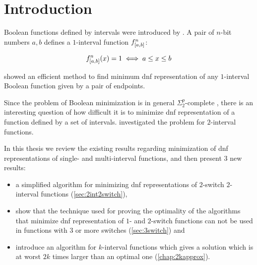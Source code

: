 \chapter*{Introduction}

Boolean functions defined by intervals were introduced
by \citet{Schieber2005154}.
A pair of $n$-bit numbers $a, b$
defines a $1$-interval function
$f^{n}_{[a, b]}$:

\[
f^{n}_{[a, b]} (x) = 1
\iff a \leq x \leq b
\]

\citeauthor{Schieber2005154} showed an efficient method
to find minimum \acrshort{dnf} representation
of any $1$-interval Boolean function
given by a pair of endpoints.

Since the problem of Boolean minimization is in general
$\Sigma_2^p$-complete \citep{Umans1998},
there is an interesting question of how difficult it is
to minimize \acrshort{dnf} representation of
a function defined by a set of intervals.
\citeauthor{Dubovsky2012} investigated the problem
for $2$-interval functions.

In this thesis we review the existing results regarding
minimization of \acrshort{dnf} representations of
single- and multi-interval functions,
and then present 3 new results:

\begin{itemize}
\item a simplified algorithm
for minimizing \acrshort{dnf} representations
of $2$-switch
$2$-interval functions (\autoref{sec:2int2switch}),
\item
show that the technique used for proving the optimality
of the algorithms that minimize
\acrshort{dnf} representation
of $1$- and $2$-switch functions
can not be used in
functions with $3$ or more switches
(\autoref{sec:3switch}) and
\item
introduce an algorithm
for $k$-interval functions
which gives a solution which is at worst
$2k$ times larger than an optimal one
(\autoref{chap:2kapprox}).
\end{itemize}
